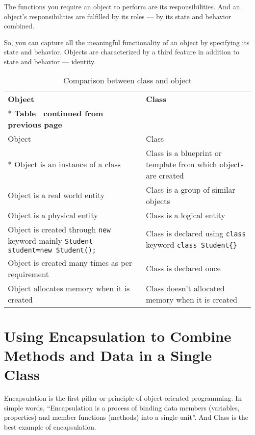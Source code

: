 The functions you require an object to perform are its responsibilities. And an object's responsibilities are fulfilled by its roles — by its state and behavior combined.

So, you can capture all the meaningful functionality of an object by specifying its state and behavior. Objects are characterized by a third feature in addition to state and behavior —
identity.


\begin{longtable}[c]{@{}p{6cm}p{6cm}@{}}
	\caption{Comparison between class and object}
	\label{tab:class-object}\\
	\toprule
	\textbf{Object}        & \textbf{Class}  \\* \midrule
	\endfirsthead
	\multicolumn{2}{c}%
	{{\bfseries Table \thetable\ continued from previous page}} \\
	\toprule
	Object                                                                                                                       & Class                                                                                                         \\* \midrule
	\endhead
	Object is an instance of a class  & Class is a blueprint or template from which objects are created  \\
	Object is a real world entity   & Class is a group of similar objects                                                                         \\
	Object is a physical entity   & Class is a logical entity                                                                                  \\
	Object is created through \texttt{new} keyword  mainly \lstinline|Student student=new Student();| & Class is declared using \texttt{class} keyword \lstinline|class Student{}| \\
Object is created  many times as per requirement    & Class is declared once \\
Object allocates memory when it is created     & Class doesn't allocated memory when it is created  \\
\bottomrule            
\end{longtable}


\section{Using Encapsulation to Combine Methods and Data in a Single Class}
Encapsulation is the first pillar or principle of object-oriented programming. In simple words, ``Encapsulation is a process of binding data members (variables, properties) and
member functions (methods) into a single unit”. And Class is the best example of encapsulation.

